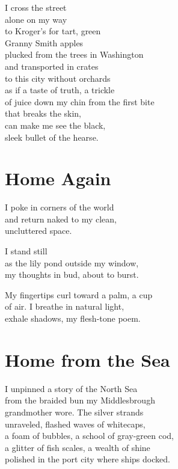 \documentclass[twoside,10pt]{book}
\begin{document}
I cross the street\\
alone on my way\\
to Kroger's for tart, green\\
Granny Smith apples\\
plucked from the trees in Washington\\
and transported in crates\\
to this city without orchards\\
as if a taste of truth, a trickle\\
of juice down my chin from the first bite\\
that breaks the skin,\\
can make me see the black,\\
sleek bullet of the hearse.


\clearpage
\section{Home Again}

I poke in corners of the world\\
and return naked to my clean,\\
uncluttered space.

I stand still\\
as the lily pond outside my window,\\
my thoughts in bud, about to burst.

My fingertips curl toward a palm, a cup\\
of air. I breathe in natural light,\\
exhale shadows, my flesh-tone poem.


\clearpage
\section{Home from the Sea}

I unpinned a story of the North Sea\\
from the braided bun my Middlesbrough\\
grandmother wore. The silver strands\\
unraveled, flashed waves of whitecaps,\\
a foam of bubbles, a school of gray-green cod,\\
a glitter of fish scales, a wealth of shine\\
polished in the port city where ships docked.
\end{document}
